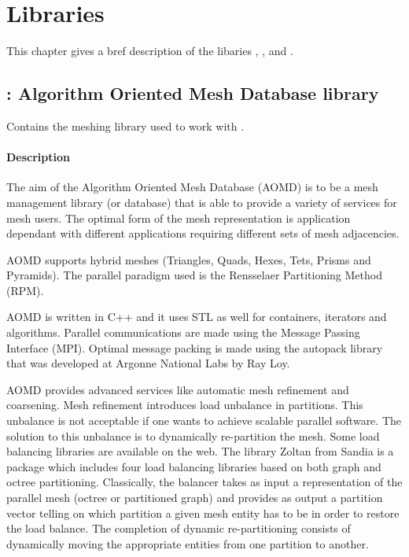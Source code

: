 



\section{Libraries}

This chapter gives a bref description of the libaries  ,
,  and  .


\subsection{: Algorithm Oriented Mesh Database library  }

Contains the meshing library used to work with  .

\paragraph*{Description}

 The aim of the Algorithm Oriented Mesh Database (AOMD) is to be a mesh management library (or database) that is able
  to provide a variety of services for mesh users. The optimal form of the mesh representation is application dependant
  with different applications requiring different sets of mesh adjacencies.

 AOMD supports hybrid meshes (Triangles, Quads, Hexes, Tets, Prisms and Pyramids). The parallel paradigm used is
 the Rensselaer  Partitioning Method (RPM).

AOMD is written in C++ and it uses STL as well for containers,
iterators and algorithms. Parallel communications are made using the
Message Passing Interface (MPI). Optimal message packing is made
using the autopack library that was developed at Argonne National
Labs by Ray Loy.

AOMD provides advanced services like automatic mesh refinement and
coarsening. Mesh refinement introduces load unbalance in partitions.
This unbalance is not acceptable if one wants to achieve scalable
parallel software. The solution to this unbalance is to dynamically
re-partition the mesh. Some load balancing libraries are available
on the web. The library Zoltan from Sandia is a package which
includes four load balancing libraries based on both graph and
octree partitioning. Classically, the balancer takes as input a
representation of the parallel mesh (octree or partitioned graph)
and provides as output a partition vector telling on which partition
a given mesh entity has to be in order to restore the load balance.
The completion of dynamic re-partitioning consists of dynamically
moving the appropriate entities from one partition to another.


